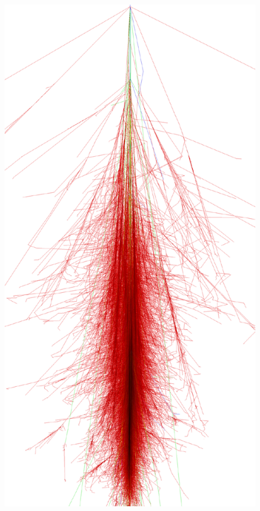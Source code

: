 \documentclass[main.tex]{subfiles}
\begin{document}
\begin{figure}[!htb]
  \includegraphics[width=\linewidth]{Pictures/proton_12_0deg.pdf}
  \endminipage\hfill

\end{figure}
\end{document}
